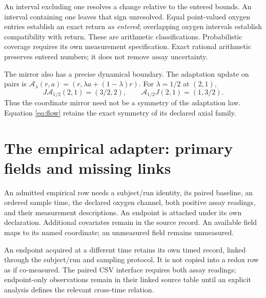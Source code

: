 \documentclass[11pt]{article}
\begin{document}
An interval excluding one resolves a change relative to the entered bounds.
An interval containing one leaves that sign unresolved. Equal point-valued
oxygen entries establish an exact return \emph{as entered}; overlapping
oxygen intervals establish compatibility with return. These are arithmetic
classifications. Probabilistic coverage requires its own measurement
specification. Exact rational arithmetic preserves entered numbers; it does
not remove assay uncertainty.

The mirror also has a precise dynamical boundary. The adaptation update
on pairs is \(\mathcal A_\lambda(r,a)=(r,\lambda a+(1-\lambda)r)\).
For \(\lambda=1/2\) at \((2,1)\),
\[
 J\mathcal A_{1/2}(2,1)=(3/2,2),
 \qquad \mathcal A_{1/2}J(2,1)=(1,3/2).
\]
Thus the coordinate mirror need not be a symmetry of the adaptation law.
Equation \eqref{eq:flow} retains the exact symmetry of its declared axial
family.

\section{The empirical adapter: primary fields and missing links}

An admitted empirical row needs a subject/run identity, its paired baseline,
an ordered sample time, the declared oxygen channel, both positive assay
readings, and their measurement descriptions. An endpoint is attached under
its own declaration. Additional covariates remain in the source record.
An available field maps to its named coordinate; an unmeasured field
remains unmeasured.

An endpoint acquired at a different time retains its own timed record,
linked through the subject/run and sampling protocol. It is not copied
into a redox row as if co-measured. The paired CSV interface requires
both assay readings; endpoint-only observations remain in their linked
source table until an explicit analysis defines the relevant cross-time
relation.
\end{document}
